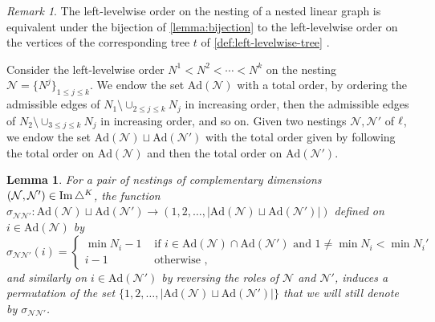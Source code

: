 \documentclass[twoside, 11pt]{amsart}
\newtheorem{lemma}[definition]{Lemma}
\theoremstyle{remark}
\newtheorem{remark}[definition]{\sc Remark}
\begin{document}
\begin{remark}
The left-levelwise order on the nesting of a nested linear graph is equivalent under the bijection of \cref{lemma:bijection} to the left-levelwise order on the vertices of the corresponding tree $t$ of \cref{def:left-levelwise-tree} .
\end{remark}

Consider the left-levelwise order $N^1<N^2<\cdots < N^k$ on the nesting $\mathcal{N}=\{N^j\}_{1\leq j \leq k}$.
We endow the set $\mathrm{Ad}(\mathcal{N})$ with a total order, by ordering the admissible edges of $N_1 \setminus \cup_{2\leq j \leq k} N_j$ in increasing order, then the admissible edges of $N_2 \setminus \cup_{3\leq j \leq k} N_j$ in increasing order, and so on. Given two nestings $\mathcal{N}, \mathcal{N}'$ of $\ell$, we endow the set $\mathrm{Ad}(\mathcal{N})\sqcup \mathrm{Ad}(\mathcal{N}')$ with the total order given by following the total order on $\mathrm{Ad}(\mathcal{N})$ and then the total order on $\mathrm{Ad}(\mathcal{N}')$. 

\begin{lemma} 
\label{prop:signs-ass}
For a pair of nestings of complementary dimensions $(\mathcal{N}, \mathcal{N}')\in \operatorname{Im}\triangle^K$, the function $\sigma_{\mathcal{N}\mathcal{N}'}: \mathrm{Ad}(\mathcal{N})\sqcup \mathrm{Ad}(\mathcal{N}') \to (1,2,\ldots,|\mathrm{Ad}(\mathcal{N})\sqcup \mathrm{Ad}(\mathcal{N}')|)$ defined on $i \in \mathrm{Ad}(\mathcal{N})$ by 
\begin{equation*}
  \sigma_{\mathcal{N}\mathcal{N}'}(i)= 
  \begin{cases}
    \min N_i -1 & \text{ if } i \in \mathrm{Ad}(\mathcal{N})\cap \mathrm{Ad}(\mathcal{N}') \text{ and } 1 \neq \min N_i < \min N_i' \\ 
    i-1 & \text{ otherwise ,} 
  \end{cases}
\end{equation*}
and similarly on $i \in \mathrm{Ad}(\mathcal{N}')$ by reversing the roles of $\mathcal{N}$ and $\mathcal{N}'$, induces a permutation of the set $\{1,2,\ldots,|\mathrm{Ad}(\mathcal{N})\sqcup \mathrm{Ad}(\mathcal{N}')|\}$ that we will still denote by $\sigma_{\mathcal{N}\mathcal{N}'}$.
\end{lemma}
\end{document}
